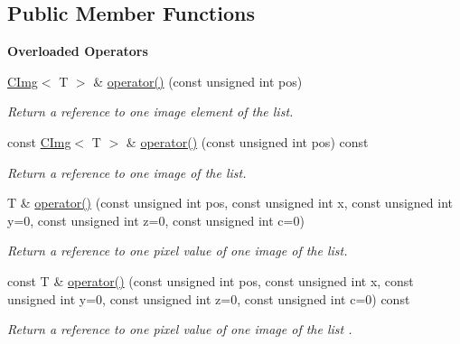 \subsection*{Public Member Functions}
\begin{Indent}\textbf{ Overloaded Operators}\par
\begin{DoxyCompactItemize}
\item 
\hyperlink{structcimg__library__suffixed_1_1CImg}{C\+Img}$<$ T $>$ \& \hyperlink{structcimg__library__suffixed_1_1CImgList_acb8186979d4d596cd69d2abda059a23d}{operator()} (const unsigned int pos)
\begin{DoxyCompactList}\small\item\em Return a reference to one image element of the list. \end{DoxyCompactList}\item 
const \hyperlink{structcimg__library__suffixed_1_1CImg}{C\+Img}$<$ T $>$ \& \hyperlink{structcimg__library__suffixed_1_1CImgList_a63cea4a181ea0dc5cef0e9c382745b3a}{operator()} (const unsigned int pos) const
\begin{DoxyCompactList}\small\item\em Return a reference to one image of the list. \end{DoxyCompactList}\item 
T \& \hyperlink{structcimg__library__suffixed_1_1CImgList_af23126de5ab40bf16fc361202909d33b}{operator()} (const unsigned int pos, const unsigned int x, const unsigned int y=0, const unsigned int z=0, const unsigned int c=0)
\begin{DoxyCompactList}\small\item\em Return a reference to one pixel value of one image of the list. \end{DoxyCompactList}\item 
\mbox{\label{structcimg__library__suffixed_1_1CImgList_a977a581ab40fc80b32e56cee78170abf}} 
const T \& \hyperlink{structcimg__library__suffixed_1_1CImgList_a977a581ab40fc80b32e56cee78170abf}{operator()} (const unsigned int pos, const unsigned int x, const unsigned int y=0, const unsigned int z=0, const unsigned int c=0) const
\begin{DoxyCompactList}\small\item\em Return a reference to one pixel value of one image of the list . \end{DoxyCompactList}\item 

\end{DoxyCompactItemize}
\end{Indent}
